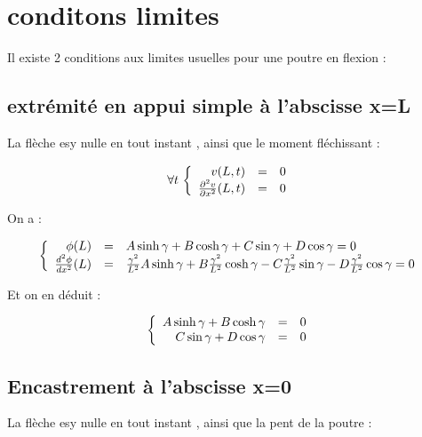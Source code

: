 \documentclass[a4paper,10pt]{report} %
\begin{document}
\section{conditons limites}

Il existe 2 conditions aux limites usuelles pour une poutre en flexion :

\subsection{extrémité en appui simple à l'abscisse x=L}

La flèche esy nulle en tout instant , ainsi que le moment fléchissant :

\begin{equation}
    \forall t\, 
    \left\{
    \begin{array}{r c l}v(L,t)&=&0\\\frac{\partial ^2v}{\partial x^2}(L,t)&=&0
    \end{array}
    \right.
\end{equation}

On a :

\begin{equation}
    \left\{
    \begin{array}{r c l}
    \phi (L)&=&A\sinh{\gamma}+B\cosh{\gamma}+C\sin{\gamma}+D\cos{\gamma}=0\\
    \frac{d^2\phi}{dx^2}(L)&=&\frac{\gamma^2}{L^2}A\sinh{\gamma}+B\frac{\gamma^2}{L^2}\cosh{\gamma}-C\frac{\gamma^2}{L^2}\sin{\gamma}-D\frac{\gamma^2}{L^2}\cos{\gamma}=0
    \end{array}
    \right.
\end{equation}

Et on en déduit :

\begin{equation}
    \left \{
    \begin{array}{r c l}
    A\sinh{\gamma}+B\cosh{\gamma}&=&0\\
    C\sin{\gamma}+D\cos{\gamma}&=&0
    \end{array}
    \right.
\end{equation}

\subsection{Encastrement à l'abscisse x=0}

La flèche esy nulle en tout instant , ainsi que la pent de la poutre : 
\end{document}

